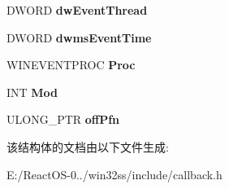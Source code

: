 \begin{DoxyCompactItemize}
D\+W\+O\+RD {\bfseries dw\+Event\+Thread}
\item 
\mbox{\label{struct___e_v_e_n_t_p_r_o_c___c_a_l_l_b_a_c_k___a_r_g_u_m_e_n_t_s_a3cda7a575839aeb428f6373b7f661f7d}} 
D\+W\+O\+RD {\bfseries dwms\+Event\+Time}
\item 
\mbox{\label{struct___e_v_e_n_t_p_r_o_c___c_a_l_l_b_a_c_k___a_r_g_u_m_e_n_t_s_a382eec34b29c87fdda7fe29d51a6af50}} 
W\+I\+N\+E\+V\+E\+N\+T\+P\+R\+OC {\bfseries Proc}
\item 
\mbox{\label{struct___e_v_e_n_t_p_r_o_c___c_a_l_l_b_a_c_k___a_r_g_u_m_e_n_t_s_a717c183b6fe6cc035d9e79cd6e535468}} 
I\+NT {\bfseries Mod}
\item 
\mbox{\label{struct___e_v_e_n_t_p_r_o_c___c_a_l_l_b_a_c_k___a_r_g_u_m_e_n_t_s_ad61ffd9e8f924bb4480a77d8f33ee54d}} 
U\+L\+O\+N\+G\+\_\+\+P\+TR {\bfseries off\+Pfn}
\end{DoxyCompactItemize}


该结构体的文档由以下文件生成\+:\begin{DoxyCompactItemize}
\item 
E\+:/\+React\+O\+S-\/0../win32ss/include/callback.\+h\end{DoxyCompactItemize}

